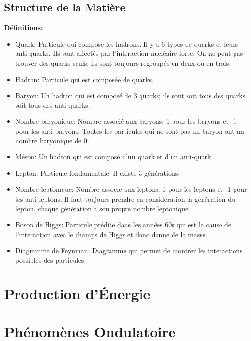 \documentclass[french, a4paper, 12pt]{article}
\begin{document}
\subsection{Structure de la Matière}
\textbf{Définitions:}
\begin{itemize}
\item Quark: Particule qui compose les hadrons. Il y a 6 types de quarks et leurs anti-quarks. Ils sont affectés par l'interaction nucléaire forte. On ne peut pas trouver des quarks seuls; ils sont toujours regroupés en deux ou en trois.
\item Hadron: Particule qui est composée de quarks.
\item Baryon: Un hadron qui est composé de 3 quarks; ils sont soit tous des quarks soit tous des anti-quarks.
\item Nombre baryonique: Nombre associé aux baryons; 1 pour les baryons et -1 pour les anti-baryons. Toutes les particules qui ne sont pas un baryon ont un nombre baryonique de 0.
\item Méson: Un hadron qui est composé d'un quark et d'un anti-quark.
\item Lepton: Particule fondamentale. Il existe 3 générations.
\item Nombre leptonique: Nombre associé aux leptons, 1 pour les leptons et -1 pour les anti-leptons. Il faut toujours prendre en considération la génération du lepton, chaque génération a son propre nombre leptonique.
\item Boson de Higgs: Particule prédite dans les années 60s qui est la cause de l'interaction avec le champs de Higgs et donc donne de la masse.
\item Diagramme de Feynman: Diagramme qui permet de montrer les interactions possibles des particules.
\end{itemize}
\pagebreak

\section{Production d'Énergie}
\pagebreak

\section{Phénomènes Ondulatoire}
\end{document}
